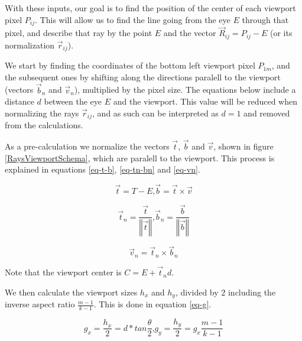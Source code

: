 With these inputs, our goal is to find the position of the center of each viewport pixel $P_{ij}$. This will allow us to find the line going from the eye $E$ through that pixel, and describe that ray by the point $E$ and the vector $\overrightarrow{R}_{ij} = P_{ij} - E$ (or its normalization $\overrightarrow{r}_{ij}$).

We start by finding the coordinates of the bottom left viewport pixel $P_{1m}$, and the subsequent ones by shifting along the directions paralell to the viewport (vectors $\overrightarrow{b}_{n}$ and $\overrightarrow{v}_{n}$), multiplied by the pixel size. The equations below include a distance $d$ between the eye $E$ and the viewport. This value will be reduced when normalizing the rays $\overrightarrow{r}_{ij}$, and as such can be interpreted as $d=1$ and removed from the calculations.

As a pre-calculation we normalize the vectors $\overrightarrow{t}$, $\overrightarrow{b}$ and $\overrightarrow{v}$, shown in figure \ref{RaysViewportSchema}, which are paralell to the viewport. This process is explained in equations \ref{eq-t-b}, \ref{eq-tn-bn} and \ref{eq-vn}.

\begin{equation}
  \overrightarrow{t} = T - E
  \text{,}
  \overrightarrow{b} = \overrightarrow{t} \times \overrightarrow{v}
  \label{eq-t-b}
\end{equation}

\begin{equation}
  \overrightarrow{t}_{n} = \frac{\overrightarrow{t}}{\left\Vert \overrightarrow{t} \right\Vert}
  \text{,}
  \overrightarrow{b}_{n} = \frac{\overrightarrow{b}}{\left\Vert \overrightarrow{b} \right\Vert}
  \label{eq-tn-bn}
\end{equation}

\begin{equation}
  \overrightarrow{v}_{n} = \overrightarrow{t}_{n} \times \overrightarrow{b}_{n}
  \label{eq-vn}
\end{equation}

Note that the viewport center is $C = E + \overrightarrow{t}_{n}d$.

We then calculate the viewport sizes $h_x$ and $h_y$, divided by $2$ including the inverse aspect ratio $\frac{m-1}{k-1}$. This is done in equation \ref{eq-g}.

\begin{equation}
  g_x = \frac{h_x}{2} = d * tan \frac{\theta}{2}
  \text{,}
  g_y = \frac{h_y}{2} = g_x \frac{m-1}{k-1}
  \label{eq-g}
\end{equation}

